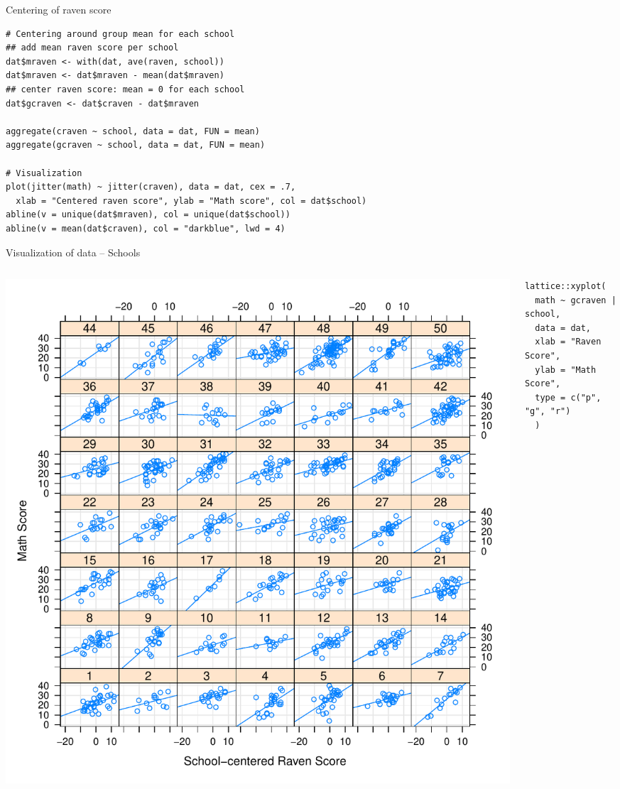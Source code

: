 \documentclass[aspectratio=169]{beamer}
\begin{document}
\begin{frame}[fragile]{Centering of raven score}
  \begin{lstlisting}
# Centering around group mean for each school
## add mean raven score per school
dat$mraven <- with(dat, ave(raven, school))
dat$mraven <- dat$mraven - mean(dat$mraven)
## center raven score: mean = 0 for each school
dat$gcraven <- dat$craven - dat$mraven

aggregate(craven ~ school, data = dat, FUN = mean)
aggregate(gcraven ~ school, data = dat, FUN = mean)

# Visualization
plot(jitter(math) ~ jitter(craven), data = dat, cex = .7,
  xlab = "Centered raven score", ylab = "Math score", col = dat$school)
abline(v = unique(dat$mraven), col = unique(dat$school))
abline(v = mean(dat$craven), col = "darkblue", lwd = 4)
  \end{lstlisting}
\end{frame}

\begin{frame}[fragile]{Visualization of data -- Schools}
  \begin{columns}
    \begin{column}{.5\textwidth}
      \includegraphics[scale=.4]{../figures/jsp_lattice1}
    \end{column}
    \begin{column}{.5\textwidth}
\begin{lstlisting}
lattice::xyplot(
  math ~ gcraven | school,
  data = dat,
  xlab = "Raven Score",
  ylab = "Math Score",
  type = c("p", "g", "r")
  )
\end{lstlisting}
    \end{column}
  \end{columns}
\end{frame}
\end{document}
